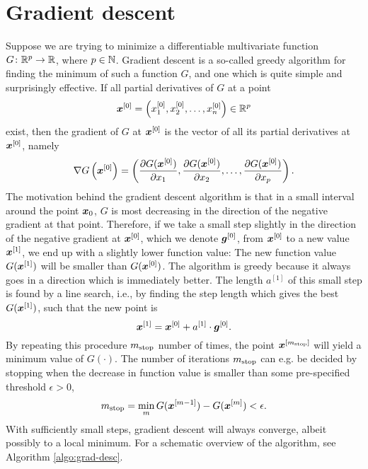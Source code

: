 \section{Gradient descent}
Suppose we are trying to minimize a differentiable multivariate function $G\colon\mathbb{R}^p\to\mathbb{R}$, where $p\in\mathbb{N}$.
Gradient descent is a so-called greedy algorithm for finding the minimum of such a function $G$, and one which is quite simple and surprisingly effective.
If all partial derivatives of $G$ at a point
\begin{equation*}
    \bm{x}^{[0]}=\left(x_1^{[0]},x_2^{[0]},\ldots,x_n^{[0]}\right)\in\mathbb{R}^p
\end{equation*}
exist, then the gradient of $G$ at $\bm{x}^{[0]}$ is the vector of all its partial derivatives at $\bm{x}^{[0]}$, namely
\begin{equation*}
    \nabla G\left(\bm{x}^{[0]}\right)=\left(\frac{\partial G(\bm{x}^{[0]})}{\partial x_1},\frac{\partial G(\bm{x}^{[0]})}{\partial x_2},\ldots,\frac{\partial G(\bm{x}^{[0]})}{\partial x_p}\right).
\end{equation*}
The motivation behind the gradient descent algorithm is that in a small interval around the point $\bm{x}_0$, $G$ is most decreasing in the direction of the negative gradient at that point.
Therefore, if we take a small step slightly in the direction of the negative gradient at $\bm{x}^{[0]}$, which we denote $\bm{g}^{[0]}$, from $\bm{x}^{[0]}$ to a new value $\bm{x}^{[1]}$, we end up with a slightly lower function value:
The new function value $G(\bm{x}^{[1]})$ will be smaller than $G(\bm{x}^{[0]})$.
The algorithm is greedy because it always goes in a direction which is immediately better.
The length $a^{[1]}$ of this small step is found by a line search, i.e., by finding the step length which gives the best $G(\bm{x}^{[1]})$, such that the new point is
\begin{equation*}
    \bm{x}^{[1]}=\bm{x}^{[0]}+a^{[1]}\cdot\boldsymbol{g}^{[0]}.
\end{equation*}
By repeating this procedure $m_{\text{stop}}$ number of times, the point $\bm{x}^{[m_{\text{stop}}]}$ will yield a minimum value of $G(\cdot)$.
The number of iterations $m_{\text{stop}}$ can e.g. be decided by stopping when the decrease in function value is smaller than some pre-specified threshold $\epsilon>0$,
\begin{equation*}
    m_{\text{stop}}=\min_m G(\bm{x}^{[m-1]})-G(\bm{x}^{[m]})<\epsilon.
\end{equation*}
With sufficiently small steps, gradient descent will always converge, albeit possibly to a local minimum.
For a schematic overview of the algorithm, see Algorithm \ref{algo:grad-desc}.

